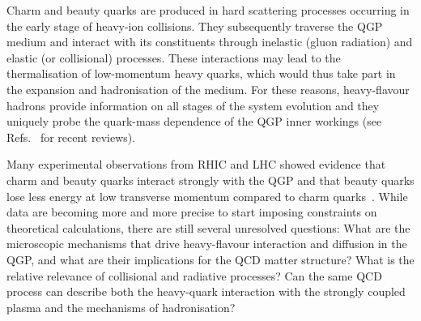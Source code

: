 Charm and beauty quarks are produced in hard scattering processes occurring in the early stage of heavy-ion collisions. They subsequently traverse the QGP medium and interact with its constituents through inelastic (gluon radiation) and elastic (or collisional) processes.
These interactions may lead to the thermalisation of low-momentum heavy quarks, which would thus take part in the expansion and hadronisation of the medium.
For these reasons, heavy-flavour hadrons provide information on all stages of the system evolution and they uniquely probe the quark-mass dependence of the QGP inner workings (see Refs.~\cite{Andronic:2015wma,Prino:2016cni,Rapp:2018qla} for recent reviews).

Many experimental observations from RHIC and LHC showed evidence that charm and beauty quarks interact strongly with the QGP and that beauty quarks lose less energy at low transverse momentum compared to charm quarks~\cite{Adam:2015nna,Khachatryan:2016ypw}. 
While data are becoming more and more precise to start imposing constraints on theoretical calculations, there are still several unresolved questions: What are the microscopic mechanisms that drive heavy-flavour interaction and diffusion in the QGP, and what are their implications for the QCD matter structure? What is the relative relevance of collisional and radiative processes? Can the same QCD process can describe both the heavy-quark interaction with the strongly coupled plasma and the mechanisms of hadronisation?

